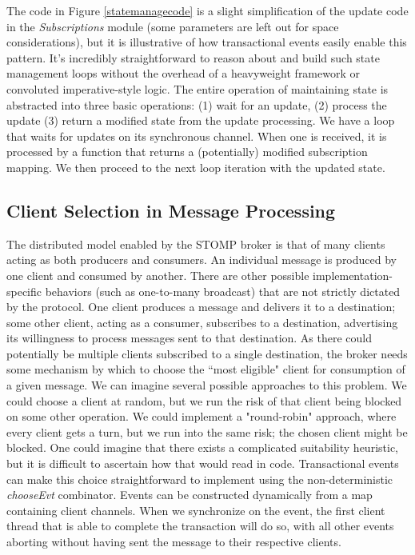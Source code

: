 \documentclass[conference, letterpaper]{IEEEtran}
\begin{document}
The code in Figure \ref{statemanagecode} is a slight simplification of the update code in the \textit{Subscriptions} module (some parameters are left out for space considerations), but it is illustrative of how transactional events easily enable this pattern. It's incredibly straightforward to reason about and build such state management loops without the overhead of a heavyweight framework or convoluted imperative-style logic. The entire operation of maintaining state is abstracted into three basic operations: (1) wait for an update, (2) process the update  (3) return a modified state from the update processing. We have a loop that waits for updates on its synchronous channel. When one is received, it is processed by a function that returns a (potentially) modified subscription mapping. We then proceed to the next loop iteration with the updated state.

\subsection{Client Selection in Message Processing}

The distributed model enabled by the STOMP broker is that of many clients acting as both producers and consumers. An individual message is produced by one client and consumed by another. There are other possible implementation-specific behaviors (such as one-to-many broadcast) that are not strictly dictated by the protocol. One client produces a message and delivers it to a destination; some other client, acting as a consumer, subscribes to a destination, advertising its willingness to process messages sent to that destination. As there could potentially be multiple clients subscribed to a single destination, the broker needs some mechanism by which to choose the ``most eligible" client for consumption of a given message. We can imagine several possible approaches to this problem. We could choose a client at random, but we run the risk of that client being blocked on some other operation. We could implement a "round-robin" approach, where every client gets a turn, but we run into the same risk; the chosen client might be blocked. One could imagine that there exists a complicated suitability heuristic, but it is difficult to ascertain how that would read in code.  Transactional events can make this choice straightforward to implement using the non-deterministic \textit{chooseEvt} combinator. Events can be constructed dynamically from a map containing client channels. When we synchronize on the event, the first client thread that is able to complete the transaction will do so, with all other events aborting without having sent the message to their respective clients.
\end{document}
